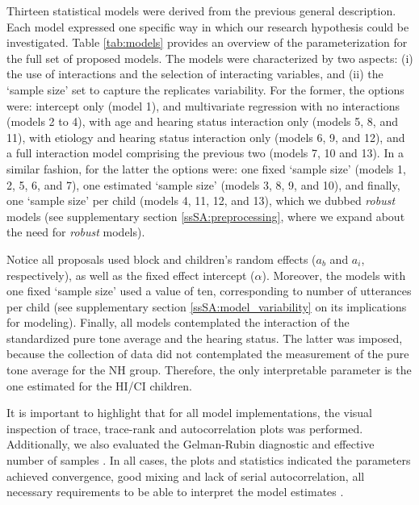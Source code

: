 Thirteen statistical models were derived from the previous general description. Each model expressed one specific way in which our research hypothesis could be investigated. Table \ref{tab:models} provides an overview of the parameterization for the full set of proposed models. The models were characterized by two aspects: (i) the use of interactions and the selection of interacting variables, and (ii) the `sample size' set to capture the replicates variability. For the former, the options were: intercept only (model 1), and multivariate regression with no interactions (models 2 to 4), with age and hearing status interaction only (models 5, 8, and 11), with etiology and hearing status interaction only (models 6, 9, and 12), and a full interaction model comprising the previous two (models 7, 10 and 13). In a similar fashion, for the latter the options were: one fixed `sample size' (models 1, 2, 5, 6, and 7), one estimated `sample size' (models 3, 8, 9, and 10), and finally, one `sample size' per child (models 4, 11, 12, and 13), which we dubbed \textit{robust} models (see supplementary section \ref{ssSA:preprocessing}, where we expand about the need for \textit{robust} models). 

Notice all proposals used block and children's random effects ($a_{b}$ and $a_{i}$, respectively), as well as the fixed effect intercept ($\alpha$). Moreover, the models with one fixed `sample size' used a value of ten, corresponding to number of utterances per child (see supplementary section \ref{ssSA:model_variability} on its implications for modeling). Finally, all models contemplated the interaction of the standardized pure tone average and the hearing status. The latter was imposed, because the collection of data did not contemplated the measurement of the pure tone average for the NH group. Therefore, the only interpretable parameter is the one estimated for the HI/CI children.

It is important to highlight that for all model implementations, the visual inspection of trace, trace-rank and autocorrelation plots was performed. Additionally, we also evaluated the Gelman-Rubin diagnostic and effective number of samples \cite{Gelman_et_al_2014}. In all cases, the plots and statistics indicated the parameters achieved convergence, good mixing and lack of serial autocorrelation, all necessary requirements to be able to interpret the model estimates \cite{McElreath_2020}.

